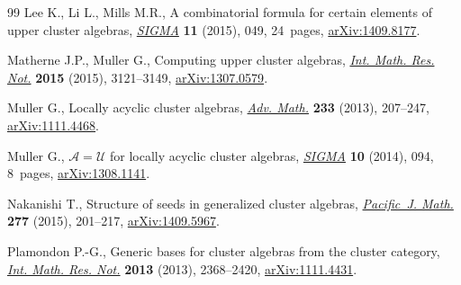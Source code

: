 \begin{thebibliography}{99}
Lee K., Li L., Mills M.R., A combinatorial formula for certain elements of
 upper cluster algebras, \href{https://doi.org/10.3842/SIGMA.2015.049}{\textit{SIGMA}} \textbf{11} (2015), 049, 24~pages,
 \href{https://arxiv.org/abs/1409.8177}{arXiv:1409.8177}.

Matherne J.P., Muller G., Computing upper cluster algebras, \href{https://doi.org/10.1093/imrn/rnu027}{\textit{Int. Math.
 Res. Not.}} \textbf{2015} (2015), 3121--3149, \href{https://arxiv.org/abs/1307.0579}{arXiv:1307.0579}.

Muller G., Locally acyclic cluster algebras, \href{https://doi.org/10.1016/j.aim.2012.10.002}{\textit{Adv. Math.}} \textbf{233}
 (2013), 207--247, \href{https://arxiv.org/abs/1111.4468}{arXiv:1111.4468}.

Muller G., {${\mathcal A}={\mathcal U}$} for locally acyclic cluster algebras,
 \href{https://doi.org/10.3842/SIGMA.2014.094}{\textit{SIGMA}} \textbf{10} (2014), 094, 8~pages, \href{https://arxiv.org/abs/1308.1141}{arXiv:1308.1141}.

Nakanishi T., Structure of seeds in generalized cluster algebras,
 \href{https://doi.org/10.2140/pjm.2015.277.201}{\textit{Pacific~J. Math.}} \textbf{277} (2015), 201--217, \href{https://arxiv.org/abs/1409.5967}{arXiv:1409.5967}.

Plamondon P.-G., Generic bases for cluster algebras from the cluster category,
 \href{https://doi.org/10.1093/imrn/rns102}{\textit{Int. Math. Res. Not.}} \textbf{2013} (2013), 2368--2420,
 \href{https://arxiv.org/abs/1111.4431}{arXiv:1111.4431}.

\end{thebibliography}
